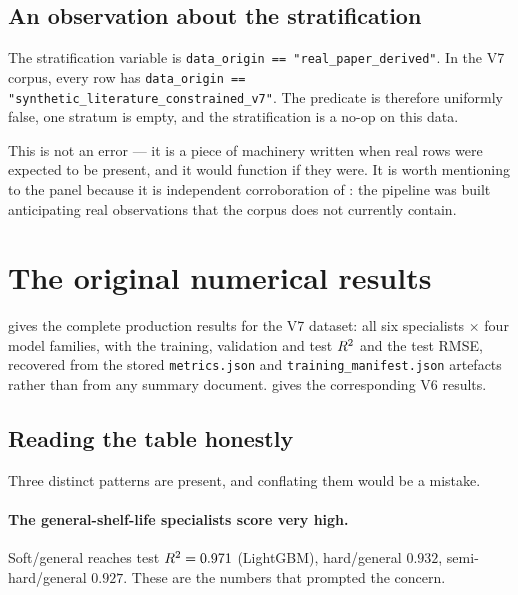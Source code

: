 \subsection{An observation about the stratification}

The stratification variable is \texttt{data\_origin ==
"real\_paper\_derived"}. In the V7 corpus, every row has
\texttt{data\_origin == "synthetic\_literature\_constrained\_v7"}. The
predicate is therefore uniformly false, one stratum is empty, and the
stratification is a no-op on this data.

This is not an error --- it is a piece of machinery written when real rows
were expected to be present, and it would function if they were. It is
worth mentioning to the panel because it is independent corroboration of
: the pipeline was built anticipating real
observations that the corpus does not currently contain.

\section{The original numerical results}

 gives the complete production results for the
V7 dataset: all six specialists $\times$ four model families, with the
training, validation and test $R^2$ and the test RMSE, recovered from the
stored \texttt{metrics.json} and \texttt{training\_manifest.json} artefacts
rather than from any summary document.  gives
the corresponding V6 results.



\subsection{Reading the table honestly}

Three distinct patterns are present, and conflating them would be a
mistake.

\paragraph{The general-shelf-life specialists score very high.}
Soft/general reaches test $R^2 = 0.971$ (LightGBM), hard/general $0.932$,
semi-hard/general $0.927$. These are the numbers that prompted the concern.

